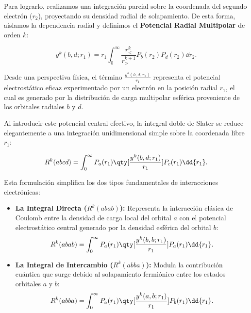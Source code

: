 Para lograrlo, realizamos una integración parcial sobre la coordenada del segundo electrón (\( r_2 \)), proyectando su densidad radial de solapamiento. De esta forma, aislamos la dependencia radial y definimos el \textbf{Potencial Radial Multipolar} de orden \( k \):

\begin{equation}
  y^k(b, d; r_1) = r_1 \int_0^\infty \frac{r_{<}^k}{r_{>}^{k+1}} P_b(r_2) P_d(r_2) \dd{r_2}.
\end{equation}

Desde una perspectiva física, el término \( \frac{y^k(b,d;r_1)}{r_1} \) representa el potencial electrostático eficaz experimentado por un electrón en la posición radial \( r_1 \), el cual es generado por la distribución de carga multipolar esférica proveniente de los orbitales radiales \( b \) y \( d \). 

Al introducir este potencial central efectivo, la integral doble de Slater se reduce elegantemente a una integración unidimensional simple sobre la coordenada libre \( r_1 \):

\begin{equation}
  R^k(abcd) = \int_0^\infty P_a(r_1) \qty[ \frac{y^k(b,d; r_1)}{r_1} ] P_c(r_1) \dd{r_1}.
\end{equation}

Esta formulación simplifica los dos tipos fundamentales de interacciones electrónicas:

\begin{itemize}
\item \textbf{La Integral Directa (\(R^k(abab)\)):}
  Representa la interacción clásica de Coulomb entre la densidad de carga local del orbital \( a \) con el potencial electrostático central generado por la densidad esférica del orbital \( b \):
  \begin{equation}
    R^k(abab) = \int_0^\infty P_a(r_1) \qty[ \frac{y^k(b,b; r_1)}{r_1} ] P_a(r_1) \dd{r_1}.
  \end{equation}
  
\item \textbf{La Integral de Intercambio (\(R^k(abba)\)):}
  Modula la contribución cuántica que surge debido al solapamiento fermiónico entre los estados orbitales \( a \) y \( b \):
  \begin{equation}
    R^k(abba) = \int_0^\infty P_a(r_1) \qty[ \frac{y^k(a,b; r_1)}{r_1} ] P_b(r_1) \dd{r_1}.
  \end{equation}
\end{itemize}

